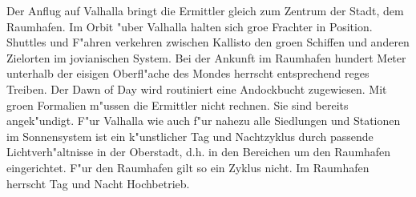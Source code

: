 

Der Anflug auf Valhalla bringt die Ermittler gleich zum Zentrum der Stadt, dem Raumhafen. Im Orbit "uber Valhalla halten sich gro\3e Frachter in Position. Shuttles und F"ahren verkehren zwischen Kallisto den gro\3en Schiffen und anderen Zielorten im jovianischen System. Bei der Ankunft im Raumhafen hundert Meter unterhalb der eisigen Oberfl"ache des Mondes herrscht entsprechend reges Treiben. Der Dawn of Day wird routiniert eine Andockbucht zugewiesen. Mit gro\3en Formalien m"ussen die Ermittler nicht rechnen. Sie sind bereits angek"undigt. F"ur Valhalla wie auch f"ur nahezu alle Siedlungen und Stationen im Sonnensystem ist ein k"unstlicher Tag und Nachtzyklus durch passende Lichtverh"altnisse in der Oberstadt, d.h. in den Bereichen um den Raumhafen eingerichtet. F"ur den Raumhafen gilt so ein Zyklus nicht. Im Raumhafen herrscht Tag und Nacht Hochbetrieb. 
